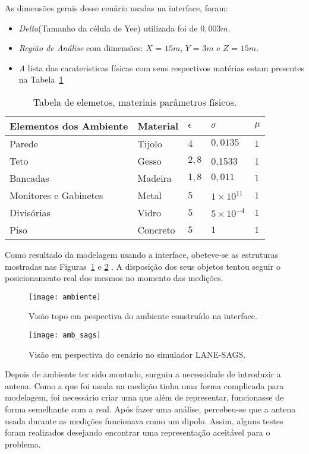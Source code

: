 As dimensões gerais desse cenário usadas na interface, foram:
\begin{itemize}
\item \textit{Delta}(Tamanho da célula de Yee) utilizada foi de $0,003m$.
\item \textit{Região de Análise} com dimensões: $X$ = $15m$, $Y$ = $3m$ e $Z$ = $15m$.
\item \textit A lista das carateristicas físicas com seus respectivos matérias estam presentes na Tabela~\ref{tab:materiais}
\end{itemize}

\begin{table}
\centering
	\begin{tabular}{|l|l|l|l|l|}
	\hline
	Elementos dos Ambiente & Material & $\epsilon$ & $\sigma$ & $\mu$ \\ \hline
	Parede & Tijolo & $4$ & $0,0135$ & $1$\\ \hline
	Teto & Gesso & $2,8$ & 0,1533 & 1 \\ \hline
	Bancadas & Madeira & $1,8$ & $0,011$ & $1$\\ \hline
	Monitores e Gabinetes & Metal & $5$ & $1\times10^{11}$ & $1$\\ \hline
	Divisórias & Vidro & $5$ & $5\times10^{-4}$ & $1$ \\ \hline
	Piso & Concreto & $5$ & $1$ & $1$ \\
	\hline
	\end{tabular}
	\caption{Tabela de elemetos, materiais parâmetros físicos.}
	\label{tab:materiais}
\end{table}

Como resultado da modelagem usando a interface, obeteve-se as estruturas mostradas nas Figuras~\ref{fg:ambiente} e \ref{fg:amb_sags} . A disposição dos seus objetos tentou seguir o posicionamento real dos mesmos no momento das medições.

\begin{figure}[!tp]
	\centering
	\texttt{[image: ambiente]}
	\caption{Visão topo em pespectiva do ambiente construído na interface.}
	\label{fg:ambiente}
\end{figure}
\begin{figure}[!tp]
	\centering
	\texttt{[image: amb\_sags]}
	\caption{Visão em pespectiva do cenário no simulador LANE-SAGS.}
	\label{fg:amb_sags}
\end{figure}

Depois de ambiente ter sido montado, surguiu a necessidade de introduzir a antena. Como a que foi usada na medição tinha uma forma complicada para modelagem, foi necessário criar uma que além de representar, funcionasse de forma semelhante com a real. Após fazer uma análise, percebeu-se que a antena usada  durante as medições funcionava como um dipolo. Assim, alguns testes foram realizados desejando encontrar uma representação aceitável para o problema.\\

